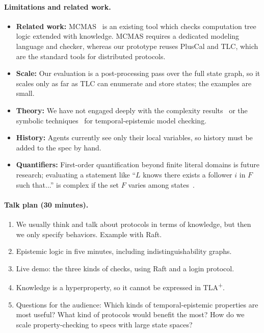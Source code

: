 \documentclass[10pt]{article}
\begin{document}
\paragraph{Limitations and related work.}
\begin{itemize}
\item \textbf{Related work:} MCMAS~\cite{mcmas} is an existing tool which checks computation tree logic extended with knowledge. MCMAS requires a dedicated modeling language and checker, whereas our prototype reuses PlusCal and TLC, which are the standard tools for distributed protocols.
\item \textbf{Scale:} Our evaluation is a post-processing pass over the full state graph, so it scales only as far as TLC can enumerate and store states; the examples are small.
\item \textbf{Theory:} We have not engaged deeply with the complexity results~\cite{bozzelli} or the symbolic techniques~\cite{lomuscio-penczek} for temporal-epistemic model checking.
\item \textbf{History:} Agents currently see only their local variables, so history must be added to the spec by hand.
\item \textbf{Quantifiers:} First-order quantification beyond finite literal domains is future research; evaluating a statement like ``$L$ knows there exists a follower $i$ in $F$ such that...'' is complex if the set $F$ varies among states~\cite{fagin}.
\end{itemize}

\paragraph{Talk plan (30 minutes).}
\begin{enumerate}
\item We usually think and talk about protocols in terms of knowledge, but then we only specify behaviors. Example with Raft.
\item Epistemic logic in five minutes, including indistinguishability graphs.
\item Live demo: the three kinds of checks, using Raft and a login protocol.
\item Knowledge is a hyperproperty, so it cannot be expressed in TLA\textsuperscript{+}.
\item Questions for the audience: Which kinds of temporal-epistemic properties are most useful? What kind of protocols would benefit the most? How do we scale property-checking to specs with large state spaces?
\end{enumerate}
\end{document}
